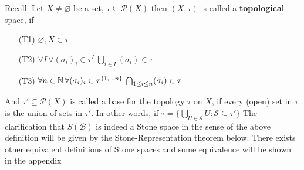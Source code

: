 Recall: Let $X\neq \varnothing$ be a set, $\tau \subseteq \mathcal{P}(X)$ then $(X,\tau)$ is called a \textbf{topological} space, if 
    \begin{enumerate}[leftmargin=1.5cm]
        \item[(T1)] $\varnothing, X\in \tau$
        \item[(T2)] $\forall I \,\forall (\sigma_i)_i\in \tau^I\: \bigcup_{i\in I}(\sigma_i)\in \tau$
        \item[(T3)] $\forall n\in \mathbb{N} \,\forall (\sigma_i)_i\in \tau^{\{1,\dots n\}}\: \bigcap_{1\leq i\leq n}(\sigma_i)\in \tau$
    \end{enumerate}
    And $\tau'\subseteq \mathcal{P}(X)$ is called a base for the topology $\tau$ on $X$,
    if every (open) set in $\tau$ is the union of sets in $\tau'$. 
    In other words, if $\tau = \{\bigcup_{U\in \mathcal{S}} U : \mathcal{S}\subseteq \tau'\}$
The clarification that $S(\mathcal{B})$ is indeed a Stone space in the sense of the above definition will be given by the Stone-Representation theorem below.
There exists other equivalent definitions of Stone spaces and some equivalence will be shown in the appendix 

